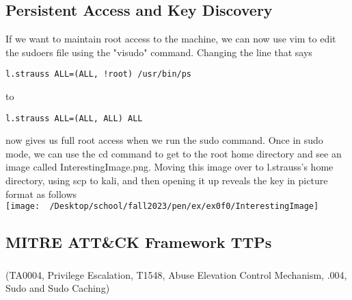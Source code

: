 \documentclass[notitlepage]{article}
\begin{document}
   \subsection{Persistent Access and Key Discovery}
   If we want to maintain root access to the machine, we can now use vim to edit the sudoers file using the "visudo" command. Changing the line that
   says 
\begin{verbatim}
l.strauss ALL=(ALL, !root) /usr/bin/ps
\end{verbatim} 
    to
\begin{verbatim}
l.strauss ALL=(ALL, ALL) ALL 
\end{verbatim}
    now gives us full root access when we run the sudo command.
    Once in sudo mode, we can use the cd command to get to the root home directory and see an image called InterestingImage.png. Moving this image over to l.strauss's home
    directory, using scp to kali, and then opening it up reveals the key in picture format as follows \\
\texttt{[image: ~/Desktop/school/fall2023/pen/ex/ex0f0/InterestingImage]} \\

    \subsection{MITRE ATT{\&}CK Framework TTPs}
    
	\subsubsection*{}
	\ttp(TA0004, Privilege Escalation, T1548, Abuse Elevation Control Mechanism, .004, Sudo and Sudo Caching)
    
\end{document}
